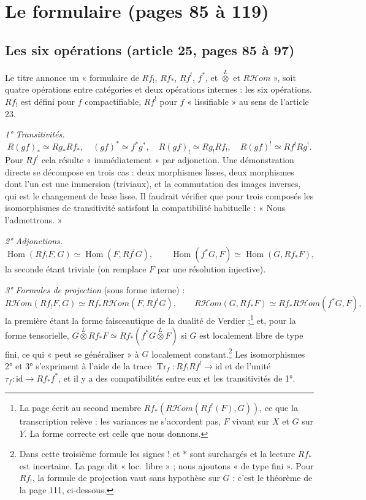 \documentclass[11pt,a4paper]{article}
\begin{document}
\section*{Le formulaire (pages 85 à 119)}

\subsection*{Les six opérations (article 25, pages 85 à 97)}

Le titre annonce un « formulaire de $Rf_{!}$, $Rf_{*}$, $Rf^{!}$, $f^{*}$, et
$\overset{L}{\otimes}$ et $R\mathcal{H}om$ », soit quatre opérations entre
catégories et deux opérations internes : les six opérations.
$Rf_{!}$ est défini pour $f$ compactifiable, $Rf^{!}$ pour $f$ « lissifiable »
au sens de l'article 23.

\emph{1° Transitivités.}
\[
  R(gf)_{*} \simeq Rg_{*}Rf_{*}, \quad (gf)^{*} \simeq f^{*}g^{*}, \quad
  R(gf)_{!} \simeq Rg_{!}Rf_{!}, \quad R(gf)^{!} \simeq Rf^{!}Rg^{!}.
\]
Pour $Rf^{!}$ cela résulte « immédiatement » par adjonction. Une démonstration
directe se décompose en trois cas : deux morphismes lisses, deux morphismes
dont l'un est une immersion (triviaux), et la commutation des images inverses,
qui est le changement de base lisse. Il faudrait vérifier que pour trois
composés les isomorphismes de transitivité satisfont la compatibilité
habituelle : « Nous l'admettrons. »

\emph{2° Adjonctions.}
\[
  \operatorname{Hom}(Rf_{!}F, G) \simeq \operatorname{Hom}(F, Rf^{!}G), \qquad
  \operatorname{Hom}(f^{*}G, F) \simeq \operatorname{Hom}(G, Rf_{*}F),
\]
la seconde étant triviale (on remplace $F$ par une résolution injective).

\emph{3° Formules de projection} (sous forme interne) :
\[
  R\mathcal{H}om(Rf_{!}F, G) \simeq Rf_{*}R\mathcal{H}om(F, Rf^{!}G), \qquad
  R\mathcal{H}om(G, Rf_{*}F) \simeq Rf_{*}R\mathcal{H}om(f^{*}G, F),
\]
la première étant la forme faisceautique de la dualité de
Verdier ;\footnote{La page écrit au second membre
$Rf_{*}(R\mathcal{H}om(Rf^{!}(F), G))$, ce que la transcription relève : les
variances ne s'accordent pas, $F$ vivant sur $X$ et $G$ sur $Y$. La forme
correcte est celle que nous donnons.} et, pour la forme tensorielle, $G
\overset{L}{\otimes} Rf_{*}F \simeq Rf_{*}(f^{*}G \overset{L}{\otimes} F)$ si
$G$ est localement libre de type fini, ce qui « peut se généraliser » à $G$
localement constant.\footnote{Dans cette troisième formule les signes $!$ et
$*$ sont surchargés et la lecture $Rf_{*}$ est incertaine. La page dit
« loc.\ libre » ; nous ajoutons « de type fini ». Pour $Rf_{!}$, la
formule de projection vaut sans hypothèse sur $G$ : c'est le théorème de la
page 111, ci-dessous.} Les isomorphismes 2° et 3° s'expriment à l'aide de la
trace $\operatorname{Tr}_{f} : Rf_{!}Rf^{!} \to \mathrm{id}$ et de l'unité
$\tau_{f} : \mathrm{id} \to Rf_{*}f^{*}$, et il y a des compatibilités entre
eux et les transitivités de 1°.
\end{document}
